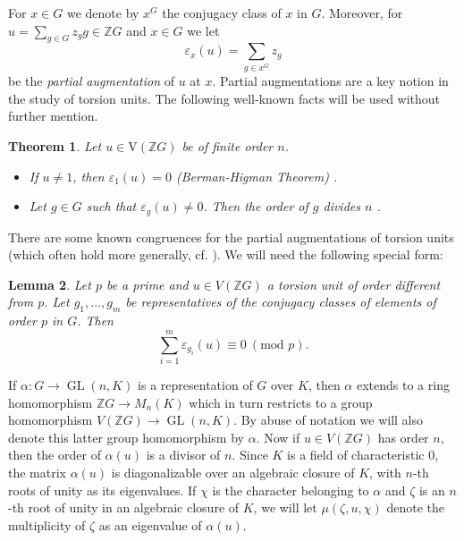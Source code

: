 \documentclass[11pt, a4paper]{amsart}
\newtheorem{theorem}{Theorem}[section]
\newtheorem{lemma}[theorem]{Lemma}
\theoremstyle{definition}
\theoremstyle{definition}
\newcommand{\GL}{\operatorname{GL}}
\newcommand{\V}{\mathrm{V}}
\begin{document}
For $x \in G$ we denote by $x^G$ the conjugacy class of $x$ in $G$. Moreover, for $u = \sum_{g \in G}z_g g \in \mathbb{Z}G$ and $x \in G$ we let 
\[\varepsilon_x(u) = \sum_{g \in x^G} z_g \]
be the \emph{partial augmentation} of $u$ at $x$. Partial augmentations are a key notion in the study of torsion units. The following well-known facts will be used without further mention.

\begin{theorem}\label{th:pAsofTorsionUnits}
Let $u \in \V(\mathbb{Z}G)$ be of finite order $n$.
\begin{itemize}
\item[(i)] If $u \neq 1$, then $\varepsilon_1(u) = 0$ (Berman-Higman Theorem) \cite[Proposition 1.5.1]{GRG1}.
\item[(ii)] Let $g\in G$ such that $\varepsilon_g(u) \neq 0$. Then the order of $g$ divides $n$ \cite[Proposition 2.2]{HertweckBrauer}.
\end{itemize}
\end{theorem}

There are some known congruences for the partial augmentations of torsion units (which often hold more generally, cf. \cite{BovdiMaroti}). We will need the following special form:  
 
\begin{lemma}\label{lem:Congruence}\cite[Lemma 2.2]{BaechleMargolisAn}
Let $p$ be a prime and $u \in V(\mathbb{Z}G)$ a torsion unit of order different from $p$. Let $g_1,\ldots,g_m$ be representatives of the conjugacy classes of elements of order $p$ in $G$. Then 
\[\sum_{i=1}^m \varepsilon_{g_i}(u) \equiv 0 \ (\textrm{mod } p). \]
\end{lemma}

If $\alpha: G \rightarrow \GL(n,K)$ is a representation of $G$ over $K$, then $\alpha$ extends to a ring homomorphism $\mathbb{Z}G \rightarrow M_n(K)$ which in turn restricts to a group homomorphism $V(\mathbb{Z}G) \rightarrow \GL(n,K)$. By abuse of notation we will also denote this latter group homomorphism by $\alpha$. Now if $u \in V(\mathbb{Z}G)$ has order $n$, then the order of $\alpha(u)$ is a divisor of $n$. Since $K$ is a field of characteristic $0$, the matrix $\alpha(u)$ is diagonalizable over an algebraic closure of $K$, with $n$-th roots of unity as its eigenvalues. If $\chi$ is the character belonging to $\alpha$ and $\zeta$ is an $n$-th root of unity in an algebraic closure of $K$, we will let $\mu(\zeta, u, \chi)$ denote the multiplicity of $\zeta$ as an eigenvalue of $\alpha(u)$.
\end{document}
